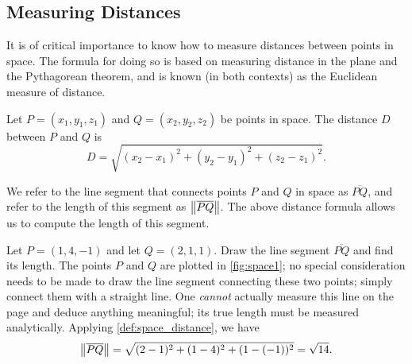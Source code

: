 
\subsection{Measuring Distances}

It is of critical importance to know how to measure distances between points in space. The formula for doing so is based on measuring distance in the plane and the Pythagorean theorem, and is known (in both contexts) as the Euclidean measure of distance.

\begin{definition}\label{def:space_distance}%
Let $P=(x_1,y_1,z_1)$ and $Q = (x_2,y_2,z_2)$ be points in space. The distance $D$ between $P$ and $Q$ is 
\[D = \sqrt{(x_2-x_1)^2+(y_2-y_1)^2+(z_2-z_1)^2}.\]
\end{definition}

We refer to the line segment that connects points $P$ and $Q$ in space as $\overline{PQ}$, and refer to the length of this segment as $\left\lVert \overline{PQ} \right\rVert$. The above distance formula allows us to compute the length of this segment.

\begin{example}\label{ex_space1}%
Let $P = (1,4,-1)$ and let $Q = (2,1,1)$. Draw the line segment $\overline{PQ}$ and find its length.
\solution
The points $P$ and $Q$ are plotted in \autoref{fig:space1}; no special consideration needs to be made to draw the line segment connecting these two points; simply connect them with a straight line. One \emph{cannot} actually measure this line on the page and deduce anything meaningful; its true length must be measured analytically. Applying \autoref{def:space_distance}, we have
%
%
\[
\norm{\overline{PQ}}= \sqrt{(2-1)^2+(1-4)^2+(1-(-1))^2} = \sqrt{14}%
.
\]
\end{example}


